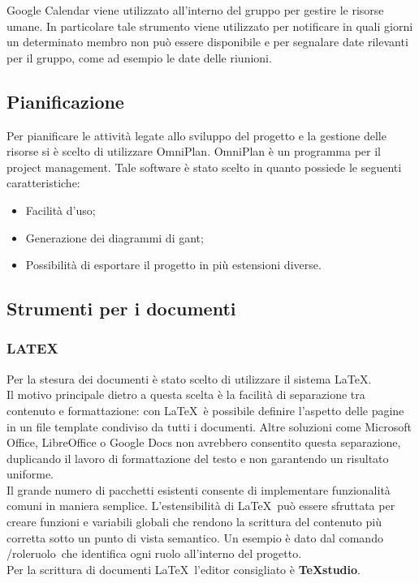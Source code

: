 Google Calendar viene utilizzato all’interno del gruppo per gestire le risorse umane. In
particolare tale strumento viene utilizzato per notificare in quali giorni un determinato
membro non può essere disponibile e per segnalare date rilevanti per il gruppo, come
ad esempio le date delle riunioni.
\subsection{Pianificazione}
\label{sec:Pianificazione}
Per pianificare le attività legate allo sviluppo del progetto e la gestione delle risorse si è scelto di utilizzare OmniPlan.
OmniPlan è un programma  per il project management. Tale software è stato scelto in quanto possiede le seguenti caratteristiche:
\begin{itemize}

\item Facilità d'uso;
\item Generazione dei diagrammi di gant;
\item Possibilità di esportare il progetto in più estensioni diverse.
\end{itemize}


\subsection{Strumenti per i documenti}
\label{sec:strumentiDocumenti}
\subsubsection{LATEX} 
 
Per la stesura dei documenti è stato scelto di utilizzare il sistema \LaTeX.\\
Il motivo 
principale dietro a questa scelta è la facilità di separazione tra contenuto e formattazione: 
con \LaTeX\ è possibile definire l’aspetto delle pagine in un file template condiviso da tutti i documenti. Altre soluzioni come Microsoft Office, LibreOffice o Google Docs non 
avrebbero consentito questa separazione, duplicando il lavoro di formattazione del testo 
e non garantendo un risultato uniforme.\\
Il grande numero di pacchetti esistenti consente di implementare funzionalità comuni 
in maniera semplice. L’estensibilità di \LaTeX\ può essere sfruttata per creare funzioni e 
variabili globali che rendono la scrittura del contenuto più corretta sotto un punto di 
vista semantico. Un esempio è dato dal comando /role\textbraceleft ruolo\textbraceright\ che identifica ogni ruolo 
all’interno del progetto.\\
Per la scrittura di documenti \LaTeX\  l’editor consigliato è \textbf{TeXstudio}. 


